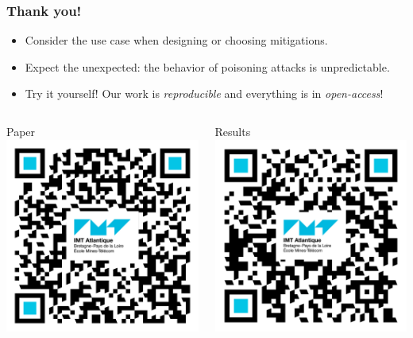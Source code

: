 \documentclass[color,t,presentation,english,aspectratio=169]{beamer}
\begin{document}
\begin{frame}
	\frametitle{Thank you!}
	\vspace{1ex}

	\begin{itemize}
		\item Consider the use case when designing or choosing mitigations.
		\item Expect the unexpected: the behavior of poisoning attacks is unpredictable.
		\item Try it yourself! Our work is \emph{reproducible} and everything is in \emph{open-access}!
	\end{itemize}\vspace{2ex}

	\begin{columns}
		\hfil\hfil
		\begin{column}{.25\textwidth}
			\centering
			\small Paper\\
			\includegraphics[width=.8\linewidth]{figures/qr-paper.png}
		\end{column}
		\hfil
		\begin{column}{.25\textwidth}
			\centering
			\small Results\\
			\includegraphics[width=.8\linewidth]{figures/qr-results.png}

\end{column}
\end{columns}
\end{frame}
\end{document}
